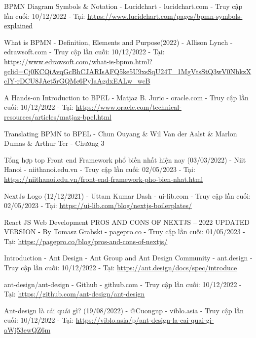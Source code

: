 {
\pagestyle{plain}


\begin{thebibliography}{80}
    BPMN Diagram Symbols \& Notation - Lucidchart - lucidchart.com - Truy cập lần cuối: 10/12/2022 - Tại: \url{https://www.lucidchart.com/pages/bpmn-symbols-explained}

    What is BPMN - Definition, Elements and Purpose(2022) - Allison Lynch - edrawsoft.com - Truy cập lần cuối: 10/12/2022 - Tại: \url{https://www.edrawsoft.com/what-is-bpmn.html?gclid=Cj0KCQiAvqGcBhCJARIsAFQ5ke5U9xsSqU24T_1MgVtsStQ3wV0NbkzXcIY-rDCU8JAet5rGQMc6PyIaAgdxEALw_wcB}

    A Hands-on Introduction to BPEL - Matjaz B. Juric - oracle.com - Truy cập lần cuối: 10/12/2022 - Tại: \url{https://www.oracle.com/technical-resources/articles/matjaz-bpel.html}

    Translating BPMN to BPEL - Chun Ouyang \& Wil Van der Aalst \& Marlon Dumas \& Arthur Ter - Chương 3

    Tổng hợp top Front end Framework phổ biến nhất hiện nay (03/03/2022) - Niit Hanoi - niithanoi.edu.vn
    - Truy cập lần cuối: 02/05/2023 - Tại: \url{https://niithanoi.edu.vn/front-end-framework-pho-bien-nhat.html}

    NextJs Logo (12/12/2021) - Uttam Kumar Dash - ui-lib.com
    - Truy cập lần cuối: 02/05/2023 - Tại: \url{https://ui-lib.com/blog/nextjs-boilerplates/}


    React JS Web Development PROS AND CONS OF NEXTJS – 2022 UPDATED VERSION - By Tomasz Grabski - pagepro.co - Truy cập lần cuối: 01/05/2023 - Tại: \url{https://pagepro.co/blog/pros-and-cons-of-nextjs/}

    Introduction - Ant Design - Ant Group and Ant Design Community - ant.design - Truy cập lần cuối: 10/12/2022 - Tại: \url{https://ant.design/docs/spec/introduce}

    ant-design/ant-design - Github - github.com - Truy cập lần cuối: 10/12/2022 - Tại: \url{https://github.com/ant-design/ant-design}

    Ant-design là cái quái gì? (19/08/2022) - @Cuongnp - viblo.asia - Truy cập lần cuối: 10/12/2022 - Tại: \url{https://viblo.asia/p/ant-design-la-cai-quai-gi-aWj53ewQZ6m}



\end{thebibliography}}
